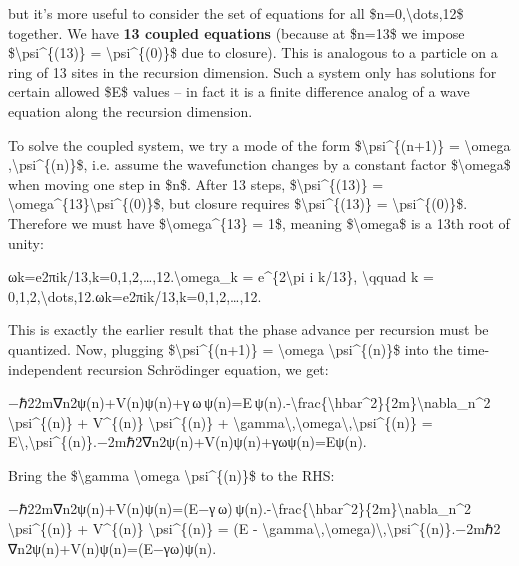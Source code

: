 \documentclass[]{article}
\begin{document}
but it's more useful to consider the set of equations for all
\$n=0,\textbackslash{}dots,12\$ together. We have \textbf{13 coupled
equations} (because at \$n=13\$ we impose
\$\textbackslash{}psi\^{}\{(13)\} = \textbackslash{}psi\^{}\{(0)\}\$ due
to closure)​. This is analogous to a particle on a ring of 13 sites in
the recursion dimension. Such a system only has solutions for certain
allowed \$E\$ values -- in fact it is a finite difference analog of a
wave equation along the recursion dimension.

To solve the coupled system, we try a mode of the form
\$\textbackslash{}psi\^{}\{(n+1)\} = \textbackslash{}omega
,\textbackslash{}psi\^{}\{(n)\}\$, i.e. assume the wavefunction changes
by a constant factor \$\textbackslash{}omega\$ when moving one step in
\$n\$​. After 13 steps, \$\textbackslash{}psi\^{}\{(13)\} =
\textbackslash{}omega\^{}\{13\}\textbackslash{}psi\^{}\{(0)\}\$, but
closure requires \$\textbackslash{}psi\^{}\{(13)\} =
\textbackslash{}psi\^{}\{(0)\}\$. Therefore we must have
\$\textbackslash{}omega\^{}\{13\} = 1\$, meaning
\$\textbackslash{}omega\$ is a 13th root of unity:

ωk=e2πik/13,k=0,1,2,\ldots{},12.\textbackslash{}omega\_k =
e\^{}\{2\textbackslash{}pi i k/13\}, \textbackslash{}qquad k =
0,1,2,\textbackslash{}dots,12.ωk​=e2πik/13,k=0,1,2,\ldots{},12.​

This is exactly the earlier result that the phase advance per recursion
must be quantized. Now, plugging \$\textbackslash{}psi\^{}\{(n+1)\} =
\textbackslash{}omega \textbackslash{}psi\^{}\{(n)\}\$ into the
time-independent recursion Schrödinger equation, we get:

−ℏ22m∇n2ψ(n)+V(n)ψ(n)+γ ω ψ(n)=E ψ(n).-\textbackslash{}frac\{\textbackslash{}hbar\^{}2\}\{2m\}\textbackslash{}nabla\_n\^{}2
\textbackslash{}psi\^{}\{(n)\} + V\^{}\{(n)\}
\textbackslash{}psi\^{}\{(n)\} +
\textbackslash{}gamma\textbackslash{},\textbackslash{}omega\textbackslash{},\textbackslash{}psi\^{}\{(n)\}
=
E\textbackslash{},\textbackslash{}psi\^{}\{(n)\}.−2mℏ2​∇n2​ψ(n)+V(n)ψ(n)+γωψ(n)=Eψ(n).

Bring the \$\textbackslash{}gamma \textbackslash{}omega
\textbackslash{}psi\^{}\{(n)\}\$ to the RHS:

−ℏ22m∇n2ψ(n)+V(n)ψ(n)=(E−γ ω) ψ(n).-\textbackslash{}frac\{\textbackslash{}hbar\^{}2\}\{2m\}\textbackslash{}nabla\_n\^{}2
\textbackslash{}psi\^{}\{(n)\} + V\^{}\{(n)\}
\textbackslash{}psi\^{}\{(n)\} = (E -
\textbackslash{}gamma\textbackslash{},\textbackslash{}omega)\textbackslash{},\textbackslash{}psi\^{}\{(n)\}.−2mℏ2​∇n2​ψ(n)+V(n)ψ(n)=(E−γω)ψ(n).​
\end{document}

